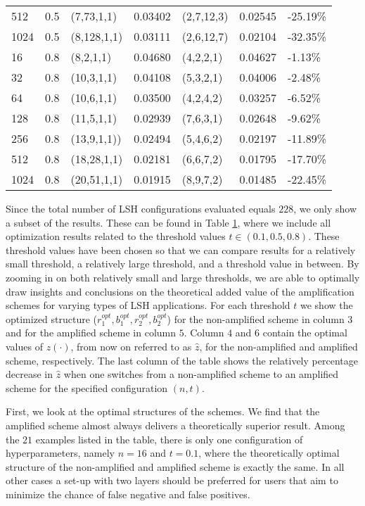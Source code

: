 \begin{table}
\begin{tabular}{l|l|l|l|l|l|l}
        512 & 0.5 & (7,73,1,1) & 0.03402 & (2,7,12,3) & 0.02545 & -25.19\% \\
        1024 & 0.5 & (8,128,1,1) & 0.03111 & (2,6,12,7) & 0.02104  & -32.35\% \\
        \hline
        16 & 0.8 & (8,2,1,1) & 0.04680 & (4,2,2,1) & 0.04627 &-1.13\%  \\
        32 & 0.8& (10,3,1,1) & 0.04108 & (5,3,2,1) & 0.04006 & -2.48\%  \\
        64 & 0.8& (10,6,1,1)& 0.03500 & (4,2,4,2) & 0.03257 &  -6.52\%  \\
        128 & 0.8 & (11,5,1,1) & 0.02939 &  (7,6,3,1) & 0.02648 & -9.62\% \\
        256 & 0.8 & (13,9,1,1)) & 0.02494 & (5,4,6,2) & 0.02197 & -11.89\% \\
        512 & 0.8 & (18,28,1,1) & 0.02181 & (6,6,7,2) & 0.01795 & -17.70\% \\
        1024 & 0.8 & (20,51,1,1) & 0.01915 & (8,9,7,2) & 0.01485  & -22.45\% \\


        \end{tabular}
\label{table:optimized_paramaters_results}
\end{table}

Since the total number of LSH configurations evaluated equals $228$, we only show a subset of the results. These can be found in Table \ref{table:optimized_paramaters_results}, where we include all optimization results related to the threshold values $t \in (0.1,0.5,0.8)$. These threshold values have been chosen so that we can compare results for a relatively small threshold, a relatively large threshold, and a threshold value in between. By zooming in on both relatively small and large thresholds, we are able to optimally draw insights and conclusions on the theoretical added value of the amplification schemes for varying types of LSH applications. For each threshold $t$ we show the optimized structure ($r_1^{opt},b_1^{opt},r_2^{opt},b_2^{opt}$) for the non-amplified scheme in column $3$ and for the amplified scheme in column $5$. Column $4$ and $6$ contain the optimal values of $z(\cdot)$, from now on referred to as $\hat{z}$, for the non-amplified and amplified scheme, respectively. The last column of the table shows the relatively percentage decrease in $\hat{z}$ when one switches from a non-amplified scheme to an amplified scheme for the specified configuration $(n,t)$.

First, we look at the optimal structures of the schemes. We find that the amplified scheme almost always delivers a theoretically superior result. Among the $21$ examples listed in the table, there is only one configuration of hyperparameters, namely $n=16$ and $t=0.1$, where the theoretically optimal structure of the non-amplified and amplified scheme is exactly the same. In all other cases a set-up with two layers should be preferred for users that aim to minimize the chance of false negative and false positives.

